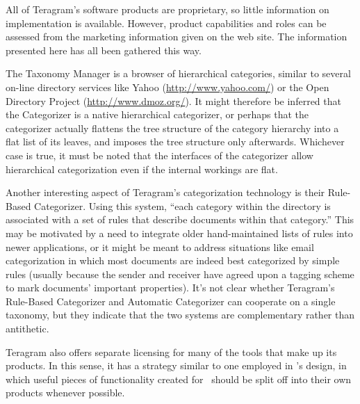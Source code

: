 All of Teragram's software products are proprietary, so little
information on implementation is available.  However, product
capabilities and roles can be assessed from the marketing information
given on the web site.  The information presented here has all been
gathered this way.

The Taxonomy Manager is a browser of hierarchical categories, similar
to several on-line directory services like Yahoo
(\url{http://www.yahoo.com/}) or the Open Directory Project
(\url{http://www.dmoz.org/}).  It might therefore be inferred that the
Categorizer is a native hierarchical categorizer, or perhaps that the
categorizer actually flattens the tree structure of the category
hierarchy into a flat list of its leaves, and imposes the tree
structure only afterwards.  Whichever case is true, it must be noted
that the interfaces of the categorizer allow hierarchical
categorization even if the internal workings are flat.

Another interesting aspect of Teragram's categorization technology is
their Rule-Based Categorizer.  Using this system, ``each category
within the directory is associated with a set of rules that describe
documents within that category.''  This may be motivated by a need to
integrate older hand-maintained lists of rules into newer
applications, or it might be meant to address situations like email
categorization in which most documents are indeed best categorized by
simple rules (usually because the sender and receiver have agreed upon
a tagging scheme to mark documents' important properties).  It's not
clear whether Teragram's Rule-Based Categorizer and Automatic
Categorizer can cooperate on a single taxonomy, but they indicate that
the two systems are complementary rather than antithetic.

Teragram also offers separate licensing for many of the tools that
make up its products.  In this sense, it has a strategy similar to one
employed in \aicat's design, in which useful pieces of
functionality created for \aicat\ should be split off into
their own products whenever possible.

